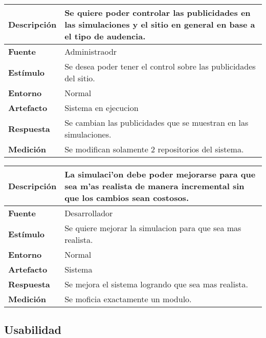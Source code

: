 \begin{center}
  \begin{tabular}{| l | p{10cm} | }
    \hline
  \textbf{Descripción} & Se quiere poder controlar las publicidades en las simulaciones y el sitio en general en base a el tipo de audencia.\\  \hline
  \textbf{Fuente} & Administraodr\\  \hline
  \textbf{Estímulo} & Se desea poder tener el control sobre las publicidades del sitio.\\  \hline
  \textbf{Entorno} & Normal\\  \hline
  \textbf{Artefacto} & Sistema en ejecucion\\  \hline
  \textbf{Respuesta} & Se cambian las publicidades que se muestran en las simulaciones.\\  \hline
  \textbf{Medición} & Se modifican solamente 2 repositorios del sistema.\\  \hline
  \end{tabular}
\end{center} 

\begin{center}
  \begin{tabular}{| l | p{10cm} | }
    \hline
  \textbf{Descripción} & La simulaci'on debe poder mejorarse para que sea m'as realista de manera incremental sin que los cambios sean costosos.\\  \hline
  \textbf{Fuente} & Desarrollador\\  \hline
  \textbf{Estímulo} & Se quiere mejorar la simulacion para que sea mas realista.\\  \hline
  \textbf{Entorno} & Normal\\  \hline
  \textbf{Artefacto} & Sistema\\  \hline
  \textbf{Respuesta} & Se mejora el sistema logrando que sea mas realista. \\  \hline
  \textbf{Medición} & Se moficia exactamente un modulo. \\  \hline
  \end{tabular}
\end{center} 



\subsection{Usabilidad}

